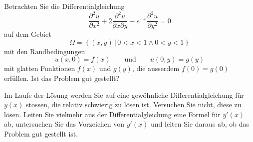 Betrachten Sie die Differentialgleichung
\begin{equation}
\frac{\partial^2 u}{\partial x^2}
+
2
\frac{\partial^2 u}{\partial x\partial y}
-
e^{-x}
\frac{\partial^2 u}{\partial y^2}
=
0
\label{90000017:dgl}
\end{equation}
auf dem Gebiet
\begin{equation}
\Omega
=
\left\{(x,y)\,\left|\, 0<x<1\wedge 0 <y<1\right.\right\}
\label{90000017:gebiet}
\end{equation}
mit den Randbedingungen
\[
u(x,0) = f(x)
\qquad\text{und}\qquad
u(0,y) = g(y)
\]
mit glatten Funktionen $f(x)$ und $g(y)$, die ausserdem $f(0)=g(0)$ erfüllen.
Ist das Problem gut gestellt?

\begin{hinweis}
Im Laufe der Lösung werden Sie auf eine gewöhnliche Differentialgleichung
für $y(x)$ stossen, die relativ schwierig zu lösen ist.
Versuchen Sie nicht, diese zu lösen.
Leiten Sie vielmehr aus der Differentialgleichung eine Formel für $y'(x)$ ab,
untersuchen Sie das Vorzeichen von $y'(x)$ und leiten Sie daraus ab,
ob das Problem gut gestellt ist.
\end{hinweis}

